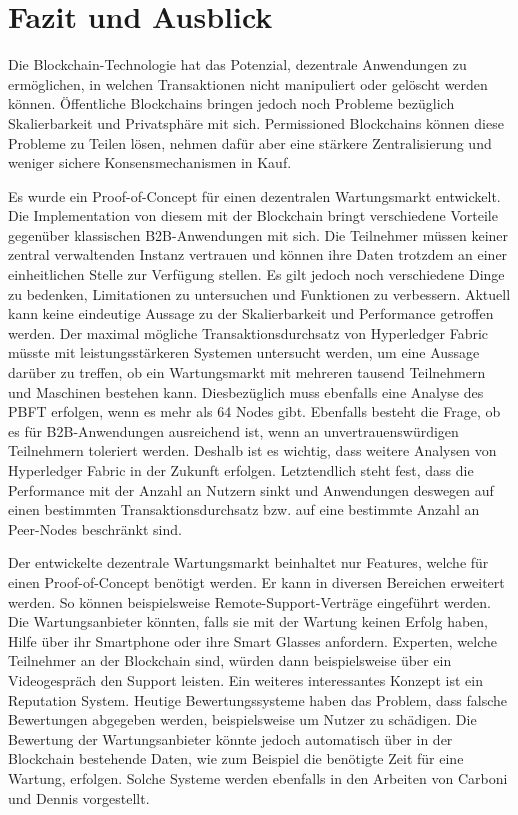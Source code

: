 \chapter{Fazit und Ausblick}
\label{cha:fazit}

Die Blockchain-Technologie hat das Potenzial, dezentrale Anwendungen zu ermöglichen, in welchen Transaktionen nicht manipuliert oder gelöscht werden können. Öffentliche Blockchains bringen jedoch noch Probleme bezüglich Skalierbarkeit und Privatsphäre mit sich. Permissioned Blockchains können diese Probleme zu Teilen lösen, nehmen dafür aber eine stärkere Zentralisierung und weniger sichere Konsensmechanismen in Kauf. 

Es wurde ein Proof-of-Concept für einen dezentralen Wartungsmarkt entwickelt. Die Implementation von diesem mit der Blockchain bringt verschiedene Vorteile gegenüber klassischen B2B-Anwendungen mit sich. Die Teilnehmer müssen keiner zentral verwaltenden Instanz vertrauen und können ihre Daten trotzdem an einer einheitlichen Stelle zur Verfügung stellen. Es gilt jedoch noch verschiedene Dinge zu bedenken, Limitationen zu untersuchen und Funktionen zu verbessern. Aktuell kann keine eindeutige Aussage zu der Skalierbarkeit und Performance getroffen werden. Der maximal mögliche Transaktionsdurchsatz von Hyperledger Fabric müsste mit leistungsstärkeren Systemen untersucht werden, um eine Aussage darüber zu treffen, ob ein Wartungsmarkt mit mehreren tausend Teilnehmern und Maschinen bestehen kann. Diesbezüglich muss ebenfalls eine Analyse des \acs{PBFT} erfolgen, wenn es mehr als 64 Nodes gibt. Ebenfalls besteht die Frage, ob es für B2B-Anwendungen ausreichend ist, wenn  an unvertrauenswürdigen Teilnehmern toleriert werden. Deshalb ist es wichtig, dass weitere Analysen von Hyperledger Fabric in der Zukunft erfolgen. Letztendlich steht fest, dass die Performance mit der Anzahl an Nutzern sinkt und Anwendungen deswegen auf einen bestimmten Transaktionsdurchsatz bzw. auf eine bestimmte Anzahl an Peer-Nodes beschränkt sind. 

Der entwickelte dezentrale Wartungsmarkt beinhaltet nur Features, welche für einen Proof-of-Concept benötigt werden. Er kann in diversen Bereichen erweitert werden. So können beispielsweise Remote-Support-Verträge eingeführt werden. Die Wartungsanbieter könnten, falls sie mit der Wartung keinen Erfolg haben, Hilfe über ihr Smartphone oder ihre Smart Glasses anfordern. Experten, welche Teilnehmer an der Blockchain sind, würden dann beispielsweise über ein Videogespräch den Support leisten. Ein weiteres interessantes Konzept ist ein Reputation System. Heutige Bewertungssysteme haben das Problem, dass falsche Bewertungen abgegeben werden, beispielsweise um Nutzer zu schädigen. Die Bewertung der Wartungsanbieter könnte jedoch automatisch über in der Blockchain bestehende Daten, wie zum Beispiel die benötigte Zeit für eine Wartung, erfolgen. Solche Systeme werden ebenfalls in den Arbeiten von Carboni \cite{CarboniFeedbackbasedReputation2015} und Dennis \cite{DennisRepblocknext2015} vorgestellt.

